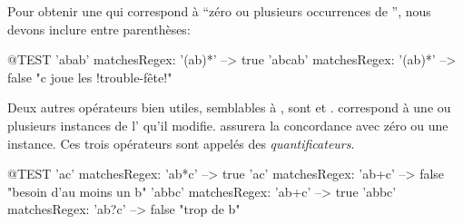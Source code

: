 \documentclass[a4paper,10pt,twoside]{book}
\begin{document}
Pour obtenir une \expreg qui correspond à ``zéro ou plusieurs
occurrences de '', nous devons inclure  entre
parenthèses:
\begin{code}{@TEST}
'abab' matchesRegex: '(ab)*'   --> true
'abcab' matchesRegex: '(ab)*' --> false    "c joue les !trouble-fête!"
\end{code} %

Deux autres opérateurs bien utiles, semblables à \ct{*}, sont \ct{+}
et . \ct{+} correspond à une ou plusieurs instances de l'\expreg
qu'il modifie.  assurera la concordance avec zéro ou une
instance.
Ces trois opérateurs sont appelés des \emph{quantificateurs}.
\begin{code}{@TEST}
'ac' matchesRegex: 'ab*c'	   --> true
'ac' matchesRegex: 'ab+c'	  --> false    "besoin d'au moins un b"
'abbc' matchesRegex: 'ab+c' --> true
'abbc' matchesRegex: 'ab?c' --> false    "trop de b"
\end{code}
\end{document}
